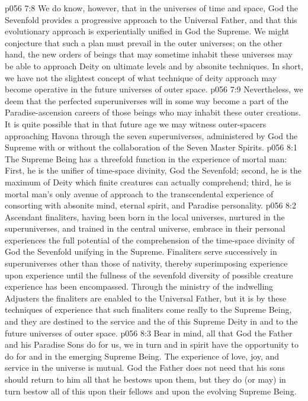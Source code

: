 \vs p056 7:8 We do know, however, that in the universes of time and space, God the Sevenfold provides a progressive approach to the Universal Father, and that this evolutionary approach is experientially unified in God the Supreme. We might conjecture that such a plan must prevail in the outer universes; on the other hand, the new orders of beings that may sometime inhabit these universes may be able to approach Deity on ultimate levels and by absonite techniques. In short, we have not the slightest concept of what technique of deity approach may become operative in the future universes of outer space.
\vs p056 7:9 Nevertheless, we deem that the perfected superuniverses will in some way become a part of the Paradise\hyp{}ascension careers of those beings who may inhabit these outer creations. It is quite possible that in that future age we may witness outer\hyp{}spacers approaching Havona through the seven superuniverses, administered by God the Supreme with or without the collaboration of the Seven Master Spirits.
\vs p056 8:1 The Supreme Being has a threefold function in the experience of mortal man: First, he is the unifier of time\hyp{}space divinity, God the Sevenfold; second, he is the maximum of Deity which finite creatures can actually comprehend; third, he is mortal man’s only avenue of approach to the transcendental experience of consorting with absonite mind, eternal spirit, and Paradise personality.
\vs p056 8:2 Ascendant finaliters, having been born in the local universes, nurtured in the superuniverses, and trained in the central universe, embrace in their personal experiences the full potential of the comprehension of the time\hyp{}space divinity of God the Sevenfold unifying in the Supreme. Finaliters serve successively in superuniverses other than those of nativity, thereby superimposing experience upon experience until the fullness of the sevenfold diversity of possible creature experience has been encompassed. Through the ministry of the indwelling Adjusters the finaliters are enabled to  the Universal Father, but it is by these techniques of experience that such finaliters come really to  the Supreme Being, and they are destined to the service and the  of this Supreme Deity in and to the future universes of outer space.
\vs p056 8:3 Bear in mind, all that God the Father and his Paradise Sons do for us, we in turn and in spirit have the opportunity to do for and in the emerging Supreme Being. The experience of love, joy, and service in the universe is mutual. God the Father does not need that his sons should return to him all that he bestows upon them, but they do (or may) in turn bestow all of this upon their fellows and upon the evolving Supreme Being.
